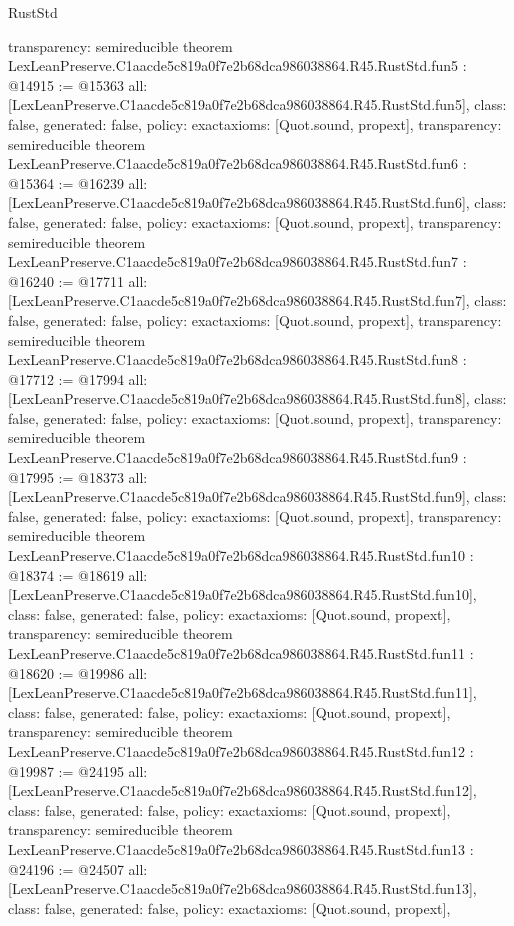 \begin{lexlean}{RustStd}
\begin{coremodule}
{  transparency: semireducible
}
theorem LexLeanPreserve.C1aacde5c819a0f7e2b68dca986038864.R45.RustStd.fun5 : @14915 := @15363 {
  all: [LexLeanPreserve.C1aacde5c819a0f7e2b68dca986038864.R45.RustStd.fun5],
  class: false,
  generated: false,
  policy: exact{axioms: [Quot.sound, propext]},
  transparency: semireducible
}
theorem LexLeanPreserve.C1aacde5c819a0f7e2b68dca986038864.R45.RustStd.fun6 : @15364 := @16239 {
  all: [LexLeanPreserve.C1aacde5c819a0f7e2b68dca986038864.R45.RustStd.fun6],
  class: false,
  generated: false,
  policy: exact{axioms: [Quot.sound, propext]},
  transparency: semireducible
}
theorem LexLeanPreserve.C1aacde5c819a0f7e2b68dca986038864.R45.RustStd.fun7 : @16240 := @17711 {
  all: [LexLeanPreserve.C1aacde5c819a0f7e2b68dca986038864.R45.RustStd.fun7],
  class: false,
  generated: false,
  policy: exact{axioms: [Quot.sound, propext]},
  transparency: semireducible
}
theorem LexLeanPreserve.C1aacde5c819a0f7e2b68dca986038864.R45.RustStd.fun8 : @17712 := @17994 {
  all: [LexLeanPreserve.C1aacde5c819a0f7e2b68dca986038864.R45.RustStd.fun8],
  class: false,
  generated: false,
  policy: exact{axioms: [Quot.sound, propext]},
  transparency: semireducible
}
theorem LexLeanPreserve.C1aacde5c819a0f7e2b68dca986038864.R45.RustStd.fun9 : @17995 := @18373 {
  all: [LexLeanPreserve.C1aacde5c819a0f7e2b68dca986038864.R45.RustStd.fun9],
  class: false,
  generated: false,
  policy: exact{axioms: [Quot.sound, propext]},
  transparency: semireducible
}
theorem LexLeanPreserve.C1aacde5c819a0f7e2b68dca986038864.R45.RustStd.fun10 : @18374 := @18619 {
  all: [LexLeanPreserve.C1aacde5c819a0f7e2b68dca986038864.R45.RustStd.fun10],
  class: false,
  generated: false,
  policy: exact{axioms: [Quot.sound, propext]},
  transparency: semireducible
}
theorem LexLeanPreserve.C1aacde5c819a0f7e2b68dca986038864.R45.RustStd.fun11 : @18620 := @19986 {
  all: [LexLeanPreserve.C1aacde5c819a0f7e2b68dca986038864.R45.RustStd.fun11],
  class: false,
  generated: false,
  policy: exact{axioms: [Quot.sound, propext]},
  transparency: semireducible
}
theorem LexLeanPreserve.C1aacde5c819a0f7e2b68dca986038864.R45.RustStd.fun12 : @19987 := @24195 {
  all: [LexLeanPreserve.C1aacde5c819a0f7e2b68dca986038864.R45.RustStd.fun12],
  class: false,
  generated: false,
  policy: exact{axioms: [Quot.sound, propext]},
  transparency: semireducible
}
theorem LexLeanPreserve.C1aacde5c819a0f7e2b68dca986038864.R45.RustStd.fun13 : @24196 := @24507 {
  all: [LexLeanPreserve.C1aacde5c819a0f7e2b68dca986038864.R45.RustStd.fun13],
  class: false,
  generated: false,
  policy: exact{axioms: [Quot.sound, propext]},
}
\end{coremodule}
\end{lexlean}
